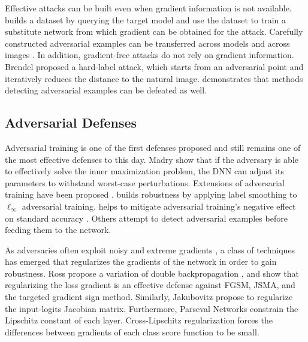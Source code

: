 Effective attacks can be built even when gradient information is not available. \cite{blackbox_attack} builds a dataset by querying the target model and use the dataset to train a substitute network from which gradient can be obtained for the attack. Carefully constructed adversarial examples can be transferred across models \cite{Liu2017:transferable,xie2018improving} and across images \cite{universal-perturbations2017}. In addition, gradient-free attacks \cite{Chen2017:zoo,Uesato2018:adversarial-risk,Ilyas2018:black-box} do not rely on gradient information. Brendel \etal \cite{Brendel2017:Decision-based-attacks} proposed a hard-label attack, which starts from an adversarial point and iteratively reduces the distance to the natural image. \cite{Carlini2017:bypass-detection} demonstrates that methods detecting adversarial examples can be defeated as well. 

\subsection{Adversarial Defenses}
Adversarial training \cite{intriguing_properties_dnns,explaining_harnessing_adv_egs} is one of the first defenses proposed and still remains one of the most effective defenses to this day. Madry \etal \cite{toward_robust_dnn} show that if the adversary is able to effectively solve the inner maximization problem, the DNN can adjust its parameters to withstand worst-case perturbations. Extensions of adversarial training have been proposed \cite{tramr2017ensemble,uesato2019labels,Shafahi2019:AT-for-free}. \cite{stutz2019confidencecalibrated} builds robustness by applying label smoothing to $\ell_{\infty}$ adversarial training. \cite{lamb2019interpolated} helps to mitigate adversarial training's negative effect on standard accuracy \cite{robustness_vs_accuracy}. Others \cite{gong2017adversarial,grosse2017statistical,metzen2017detecting,roth2019odds} attempt to detect adversarial examples before feeding them to the network. 


As adversaries often exploit noisy and extreme gradients \cite{grad_mag_and_robustness}, a class of techniques has emerged that regularizes the gradients of the network in order to gain robustness. Ross \etal \cite{input_grad_reg} propose a variation of double backpropagation \cite{double_bp}, and show that regularizing the loss gradient is an effective defense against FGSM, JSMA, and the targeted gradient sign method. Similarly, Jakubovitz \etal \cite{jacobian_reg} propose to regularize the input-logits Jacobian matrix. Furthermore, Parseval Networks \cite{parseval_nets} constrain the Lipschitz constant of each layer. Cross-Lipschitz regularization \cite{cross_lipschitz} forces the differences between gradients of each class score function to be small. 


